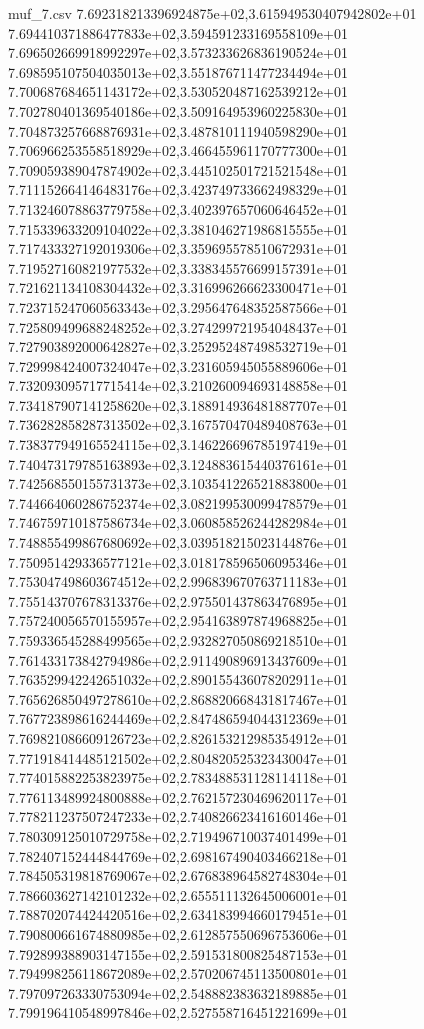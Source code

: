 \begin{filecontents*}{muf_7.csv}
7.692318213396924875e+02,3.615949530407942802e+01
7.694410371886477833e+02,3.594591233169558109e+01
7.696502669918992297e+02,3.573233626836190524e+01
7.698595107504035013e+02,3.551876711477234494e+01
7.700687684651143172e+02,3.530520487162539212e+01
7.702780401369540186e+02,3.509164953960225830e+01
7.704873257668876931e+02,3.487810111940598290e+01
7.706966253558518929e+02,3.466455961170777300e+01
7.709059389047874902e+02,3.445102501721521548e+01
7.711152664146483176e+02,3.423749733662498329e+01
7.713246078863779758e+02,3.402397657060646452e+01
7.715339633209104022e+02,3.381046271986815555e+01
7.717433327192019306e+02,3.359695578510672931e+01
7.719527160821977532e+02,3.338345576699157391e+01
7.721621134108304432e+02,3.316996266623300471e+01
7.723715247060563343e+02,3.295647648352587566e+01
7.725809499688248252e+02,3.274299721954048437e+01
7.727903892000642827e+02,3.252952487498532719e+01
7.729998424007324047e+02,3.231605945055889606e+01
7.732093095717715414e+02,3.210260094693148858e+01
7.734187907141258620e+02,3.188914936481887707e+01
7.736282858287313502e+02,3.167570470489408763e+01
7.738377949165524115e+02,3.146226696785197419e+01
7.740473179785163893e+02,3.124883615440376161e+01
7.742568550155731373e+02,3.103541226521883800e+01
7.744664060286752374e+02,3.082199530099478579e+01
7.746759710187586734e+02,3.060858526244282984e+01
7.748855499867680692e+02,3.039518215023144876e+01
7.750951429336577121e+02,3.018178596506095346e+01
7.753047498603674512e+02,2.996839670763711183e+01
7.755143707678313376e+02,2.975501437863476895e+01
7.757240056570155957e+02,2.954163897874968825e+01
7.759336545288499565e+02,2.932827050869218510e+01
7.761433173842794986e+02,2.911490896913437609e+01
7.763529942242651032e+02,2.890155436078202911e+01
7.765626850497278610e+02,2.868820668431817467e+01
7.767723898616244469e+02,2.847486594044312369e+01
7.769821086609126723e+02,2.826153212985354912e+01
7.771918414485121502e+02,2.804820525323430047e+01
7.774015882253823975e+02,2.783488531128114118e+01
7.776113489924800888e+02,2.762157230469620117e+01
7.778211237507247233e+02,2.740826623416160146e+01
7.780309125010729758e+02,2.719496710037401499e+01
7.782407152444844769e+02,2.698167490403466218e+01
7.784505319818769067e+02,2.676838964582748304e+01
7.786603627142101232e+02,2.655511132645006001e+01
7.788702074424420516e+02,2.634183994660179451e+01
7.790800661674880985e+02,2.612857550696753606e+01
7.792899388903147155e+02,2.591531800825487153e+01
7.794998256118672089e+02,2.570206745113500801e+01
7.797097263330753094e+02,2.548882383632189885e+01
7.799196410548997846e+02,2.527558716451221699e+01

\end{filecontents*}
